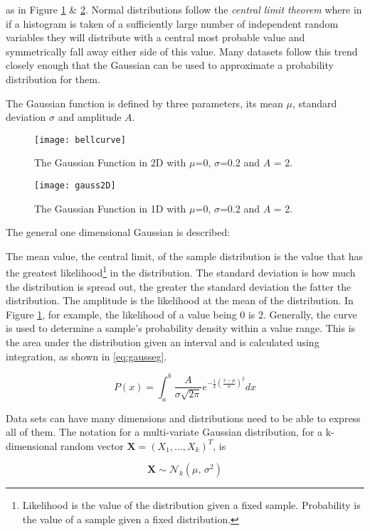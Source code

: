 as in Figure \ref{fig:gauss} \& \ref{fig:gausssurf}. Normal distributions follow the \emph{central limit theorem} where in if a histogram is taken of a sufficiently large number of independent random variables they will distribute with a central most probable value and symmetrically fall away either side of this value. Many datasets follow this trend closely enough that the Gaussian can be used to approximate a probability distribution for them. 

The Gaussian function  is defined by three parameters, its mean $\mu$, standard deviation $\sigma$ and amplitude $A$.

\begin{figure}[H]
    \centering
    \centering\texttt{[image: bellcurve]}
    \caption{The Gaussian Function in 2D with $\mu$=0, $\sigma$=0.2 and $A$ = 2.}
    \label{fig:gauss}
  \end{figure}

  \begin{figure}[H]
    \centering
    \centering\texttt{[image: gauss2D]}
    \caption{The Gaussian Function in 1D with $\mu$=0, $\sigma$=0.2 and $A$ = 2.}
    \label{fig:gausssurf}
  \end{figure}

  
  
  The general one dimensional Gaussian is described:  


  The mean value, the central limit, of the sample distribution is the value that has the greatest likelihood\footnote{Likelihood is the value of the distribution given a fixed sample. Probability is the value of a sample given a fixed distribution.} in the distribution. The standard deviation is how much the distribution is spread out, the greater the standard deviation the fatter the distribution. The amplitude is the likelihood at the mean of the distribution. In Figure \ref{fig:gauss}, for example, the likelihood of a value being 0 is 2. Generally, the curve is used to determine a sample's probability density within a value range. This is the area under the distribution given an interval and is calculated using integration, as shown in \ref{eq:gausseg}.
  
\begin{equation}
    P(x) = \int_{a}^{b}\frac{A}{\sigma\sqrt{2\pi}}e^{-\frac{1}{2}(\frac{x-\mu}{\sigma})^2}dx
    \label{eq:gausseg}
\end{equation}

Data sets can have many dimensions and distributions need to be able to express all of them. The notation for a multi-variate Gaussian distribution, for a k-dimensional random vector $ \bm{X} = (X_1,\hdots,X_k)^T$, is

\begin{equation}
    \bm{X} \sim \mathcal{N}_k(\mu,\,\sigma^{2})
\label{eq:multigauss}
\end{equation}







  
  
